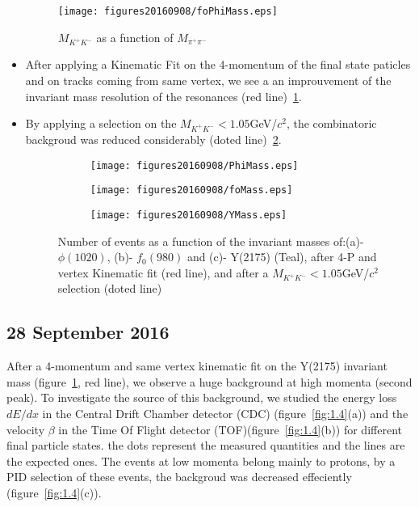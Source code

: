 \documentclass[a4paper]{article}
\begin{document}
\begin{itemize}
  \begin{figure}[h]
    \centering
    \texttt{[image: figures20160908/foPhiMass.eps]}
    \caption{ $M_{K^+K^-}$ as a function of $M_{\pi^+\pi^-}$}
    \label{fig:1.2}
  \end{figure}

  \item After applying a Kinematic Fit on the 4-momentum of the final state paticles and on tracks coming from same vertex, we see a an improuvement of the invariant mass resolution of the resonances (red line)~\ref{fig:1.2}.
  \item By applying a selection on the $M_{K^+K^-}<1.05$GeV/$c^2$, the combinatoric backgroud was reduced considerably (doted line)~\ref{fig:1.3}.

  \begin{figure}[htbp]
    \centering
    \begin{subfigure}[b]{0.3\textwidth}
      \texttt{[image: figures20160908/PhiMass.eps]}
      \caption{}
    \end{subfigure}
    \begin{subfigure}[b]{0.3\textwidth}
      \texttt{[image: figures20160908/foMass.eps]}
      \caption{}
    \end{subfigure}
    \begin{subfigure}[b]{0.3\textwidth}
      \texttt{[image: figures20160908/YMass.eps]}
      \caption{}
    \end{subfigure}
    \caption{Number of events as a function of the invariant masses of:(a)- $\phi(1020)$, (b)- $f_0(980)$ and (c)- Y(2175) (Teal), after 4-P and vertex Kinematic fit (red line), and after a $M_{K^+K^-}<1.05$GeV/$c^2$ selection (doted line)}
    \label{fig:1.3}
  \end{figure}

\end{itemize}


\clearpage
  
\subsection{28 September 2016}

 After a 4-momentum and same vertex kinematic fit on the Y(2175) invariant mass (figure~\ref{fig:1.2}, red line), we observe a huge background at high momenta (second peak). \medskip 
 To investigate the source of this background, we studied the energy loss $dE/dx$ in the Central Drift Chamber detector (CDC) (figure~\ref{fig:1.4}(a)) and the velocity $\beta$ in the Time Of Flight detector (TOF)(figure~\ref{fig:1.4}(b)) for different final particle states. the dots represent the measured quantities and the lines are the expected ones. \medskip 
The events at low momenta belong mainly to protons, by a PID selection of these events, the backgroud was decreased effeciently (figure~\ref{fig:1.4}(c)).
\end{document}
